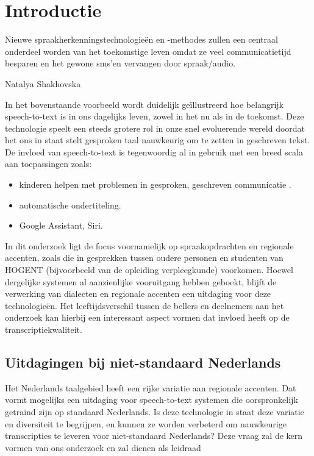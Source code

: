 \section{Introductie}%
\label{sec:introductie}
\epigraph{Nieuwe spraakherkenningstechnologieën en -methodes zullen een centraal onderdeel worden van het toekomstige leven omdat ze veel communicatietijd besparen en het gewone sms'en vervangen door spraak/audio.}{Natalya Shakhovska}

In het bovenstaande voorbeeld wordt duidelijk geïllustreerd hoe belangrijk speech-to-text is in ons dagelijks leven, zowel in het nu als in de toekomst. Deze technologie speelt een steeds grotere rol in onze snel evoluerende wereld doordat het ons in staat stelt gesproken taal nauwkeurig om te zetten in geschreven tekst. De invloed van speech-to-text is tegenwoordig al in gebruik met een breed scala aan toepassingen zoals:
\begin{itemize}
    \item kinderen helpen met problemen in gesproken, geschreven communicatie \autocite{Kambouri2023}.
    \item automatische ondertiteling.
    \item Google Assistant, Siri.
\end{itemize}

In dit onderzoek ligt de focus voornamelijk op spraakopdrachten en regionale accenten, zoals die in gesprekken tussen oudere personen en studenten van HOGENT (bijvoorbeeld van de opleiding verpleegkunde) voorkomen. Hoewel dergelijke systemen al aanzienlijke vooruitgang hebben geboekt, blijft de verwerking van dialecten en regionale accenten een uitdaging voor deze technologieën. Het leeftijdsverschil tussen de bellers en deelnemers aan het onderzoek kan hierbij een interessant aspect vormen dat invloed heeft op de transcriptiekwaliteit.

\subsection{Uitdagingen bij niet-standaard Nederlands}
Het Nederlands taalgebied heeft een rijke variatie aan regionale accenten. Dat vormt mogelijks een uitdaging voor speech-to-text systemen die oorspronkelijk getraind zijn op standaard Nederlands. Is deze technologie in staat deze variatie en diversiteit te begrijpen, en kunnen ze worden verbeterd om nauwkeurige transcripties te leveren voor niet-standaard Nederlands?
Deze vraag zal de kern vormen van ons onderzoek en zal dienen als leidraad

